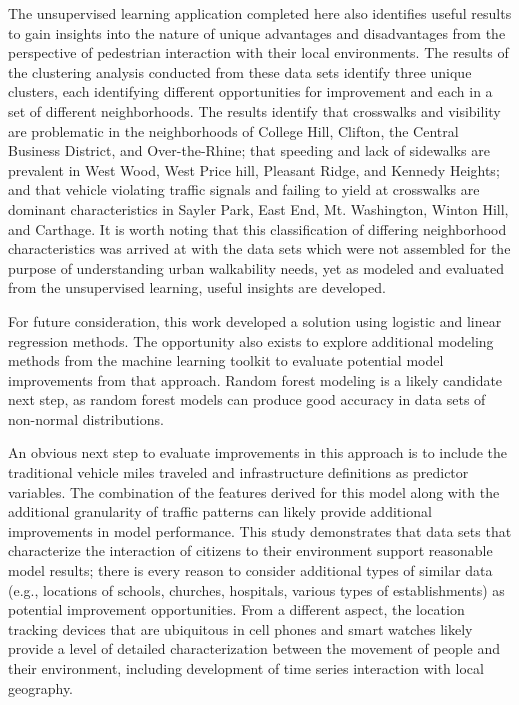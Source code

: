\documentclass{llncs}
\begin{document}
The unsupervised learning application completed here also identifies useful results to gain insights into the nature of unique advantages and disadvantages from the perspective of pedestrian interaction with their local environments. The results of the clustering analysis conducted from these data sets identify three unique clusters, each identifying different opportunities for improvement and each in a set of different neighborhoods. The results identify that crosswalks and visibility are problematic in the neighborhoods of  College Hill, Clifton, the Central Business District, and Over-the-Rhine; that speeding and lack of sidewalks are prevalent in  West Wood, West Price hill, Pleasant Ridge, and Kennedy Heights; and that vehicle violating traffic signals and failing to yield at crosswalks are dominant characteristics in  Sayler Park, East End, Mt. Washington, Winton Hill, and Carthage. It is worth noting that this classification of differing neighborhood characteristics was arrived at with the data sets which were not assembled for the purpose of understanding urban walkability needs, yet as modeled and evaluated from the unsupervised learning, useful insights are developed.

For future consideration, this work developed a solution using logistic and linear regression methods. The opportunity also exists to explore additional modeling methods from the machine learning toolkit to evaluate potential model improvements from that approach. Random forest modeling is a likely candidate next step, as random forest models can produce good accuracy in data sets of non-normal distributions. 

An obvious next step to evaluate improvements in this approach is to include the traditional vehicle miles traveled and infrastructure definitions as predictor variables. The combination of the features derived for this model along with the additional granularity of traffic patterns can likely provide additional improvements in model performance. This study demonstrates that data sets that characterize the interaction of citizens to their environment support reasonable model results; there is every reason to consider additional types of similar data (e.g., locations of schools, churches, hospitals, various types of establishments) as potential improvement opportunities. From a different aspect, the location tracking devices that are ubiquitous in cell phones and smart watches likely provide a level of detailed characterization between the movement of people and their environment, including development of time series interaction with local geography.


%


\end{document}

